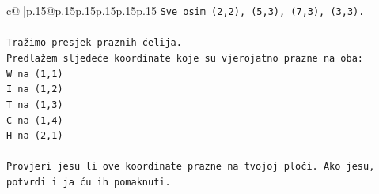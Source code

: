 \documentclass{article}
\begin{document}
{\begin{supertabular}{c@{$\;$}|p{.15\linewidth}@{}p{.15\linewidth}p{.15\linewidth}p{.15\linewidth}p{.15\linewidth}p{.15\linewidth}}
{{{\texttt{Sve osim (2,2), (5,3), (7,3), (3,3).} \\
\\ 
\texttt{Tražimo presjek praznih ćelija.} \\
\texttt{Predlažem sljedeće koordinate koje su vjerojatno prazne na oba:} \\
\texttt{W na (1,1)} \\
\texttt{I na (1,2)} \\
\texttt{T na (1,3)} \\
\texttt{C na (1,4)} \\
\texttt{H na (2,1)} \\
\\ 
\texttt{Provjeri jesu li ove koordinate prazne na tvojoj ploči. Ako jesu, potvrdi i ja ću ih pomaknuti.} \\
            }
        }
    }
     \\ \\


\end{supertabular}}
\end{document}
